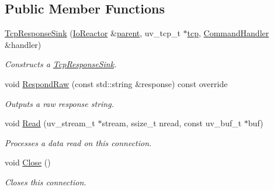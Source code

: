 \subsection*{Public Member Functions}
\begin{DoxyCompactItemize}
\item 
\hyperlink{classTcpResponseSink_aebb4578dd7b9ff9d414c936a27d0969f}{Tcp\+Response\+Sink} (\hyperlink{classIoReactor}{Io\+Reactor} \&\hyperlink{classTcpResponseSink_a190e607290f6ba6b3655c99e44a5e56e}{parent}, uv\+\_\+tcp\+\_\+t $\ast$\hyperlink{classTcpResponseSink_afa43e15736053cef76fbf27bdc3197a9}{tcp}, \hyperlink{classCommandHandler}{Command\+Handler} \&handler)
\begin{DoxyCompactList}\small\item\em Constructs a \hyperlink{classTcpResponseSink}{Tcp\+Response\+Sink}. \end{DoxyCompactList}\item 
void \hyperlink{classTcpResponseSink_a20cbf1820d293f620d6ce030fd5aadc6}{Respond\+Raw} (const std\+::string \&response) const override
\begin{DoxyCompactList}\small\item\em Outputs a raw response string. \end{DoxyCompactList}\item 
void \hyperlink{classTcpResponseSink_a9ee277599dbd6cfc5853a9145f21694b}{Read} (uv\+\_\+stream\+\_\+t $\ast$stream, ssize\+\_\+t nread, const uv\+\_\+buf\+\_\+t $\ast$buf)
\begin{DoxyCompactList}\small\item\em Processes a data read on this connection. \end{DoxyCompactList}\item 
void \hyperlink{classTcpResponseSink_a2e40c526177918ade20bec1e4f66698a}{Close} ()
\begin{DoxyCompactList}\small\item\em Closes this connection. \end{DoxyCompactList}\end{DoxyCompactItemize}
